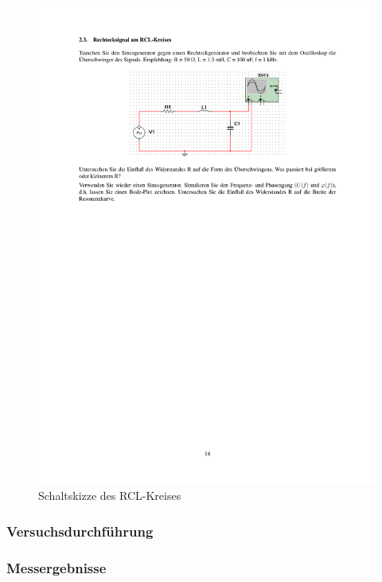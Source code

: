 \documentclass[12pt,a4paper]{article}
\begin{document}
\begin{figure}[H] 
  \centering
    \includegraphics[trim = 10mm 200mm 10mm 40mm, clip, scale = 1]{ep5_14[Page14].pdf}
  	\caption[Schaltskizze des RCL-Kreises]{Schaltskizze des RCL-Kreises\footnotemark}
  \label{fig:1}
\end{figure}

\subsubsection{Versuchsdurchführung}

\subsubsection{Messergebnisse}
\end{document}
